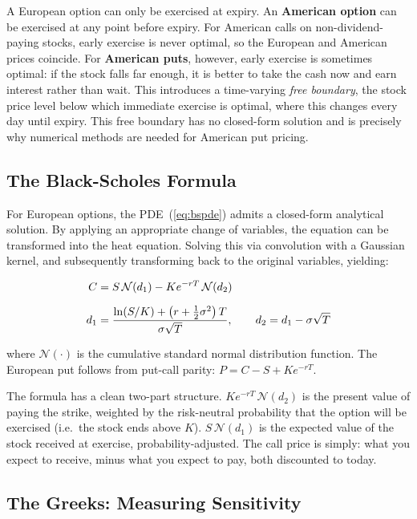 \documentclass[12pt]{article}
\begin{document}
A European option can only be exercised at expiry. An \textbf{American option} can
be exercised at any point before expiry. For American calls on non-dividend-paying
stocks, early exercise is never optimal, so the European and American prices coincide.
For \textbf{American puts}, however, early exercise is sometimes optimal: if the
stock falls far enough, it is better to take the cash now and earn interest rather
than wait. This introduces a time-varying \textit{free boundary}, the stock price
level below which immediate exercise is optimal, where this changes every day until
expiry. This free boundary has no closed-form solution and is precisely why numerical
methods are needed for American put pricing.

\subsection{The Black-Scholes Formula}
\label{sec:bsformula}

For European options, the PDE~(\ref{eq:bspde}) admits a closed-form analytical
solution. By applying an appropriate change of variables, the equation can be
transformed into the heat equation. Solving this via convolution with a Gaussian
kernel, and subsequently transforming back to the original variables, yielding:

\begin{eqbox}
\begin{align}
  C &= S\,\mathcal{N}(d_1) - K e^{-rT}\,\mathcal{N}(d_2) \label{eq:bsformula} \\[6pt]
  d_1 &= \frac{\ln(S/K) + \left(r + \tfrac{1}{2}\sigma^2\right)T}{\sigma\sqrt{T}},
  \qquad d_2 = d_1 - \sigma\sqrt{T} \notag
\end{align}
\end{eqbox}

where $\mathcal{N}(\cdot)$ is the cumulative standard normal distribution function.
The European put follows from put-call parity: $P = C - S + Ke^{-rT}$.


The formula has a clean two-part structure. $Ke^{-rT}\,\mathcal{N}(d_2)$ is the
present value of paying the strike, weighted by the risk-neutral probability that
the option will be exercised (i.e.\ the stock ends above $K$). $S\,\mathcal{N}(d_1)$
is the expected value of the stock received at exercise, probability-adjusted. The
call price is simply: what you expect to receive, minus what you expect to pay,
both discounted to today.


\subsection{The Greeks: Measuring Sensitivity}
\label{sec:greeks}
\end{document}
